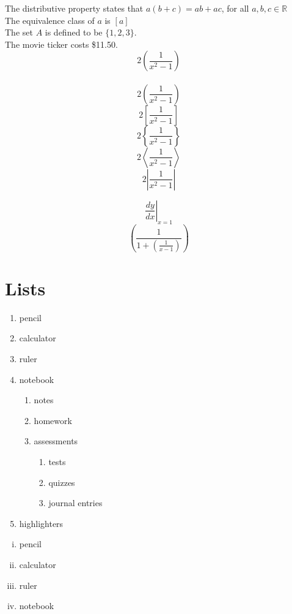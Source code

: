 \documentclass[12pt, a4paper]{article}
\begin{document}
The distributive property states that $a(b+c)
=ab+ac$, for all $a,b,c\in \mathbb{R}$\\[6pt]
The equivalence class of $a$ is $[a]$\\[6pt]
The set $A$ is defined to be $\{1,2,3\}$.\\[6pt]
The movie ticker costs \$11.50.\\[6pt]  

$$2(\frac{1}{x^2-1})$$ \\
$$2\left(\frac{1}{x^2-1}\right)$$
$$2\left[\frac{1}{x^2-1}\right]$$
$$2\left\{\frac{1}{x^2-1}\right\}$$
$$2\left\langle \frac{1}{x^2-1} \right\rangle$$
$$2\left| \frac{1}{x^2-1} \right|$$

$$\left.\frac{dy}{dx}\right|_{x=1}$$
$$\left( \frac{1}{1+\left(\frac{1}{x-1}\right)} \right)$$

\section{Lists}

\begin{enumerate}
    \item pencil
    \item calculator
    \item ruler
    \item notebook
        \begin{enumerate}
            \item notes
            \item homework
            \item assessments
            \begin{enumerate}
                \item tests
                \item quizzes
                \item journal entries
            \end{enumerate}
        \end{enumerate}
    \item highlighters
\end{enumerate}

\vspace{0.5cm}

\begin{enumerate}[i.]
    \item pencil
    \item calculator
    \item ruler
    \item notebook
\end{enumerate}
\end{document}
